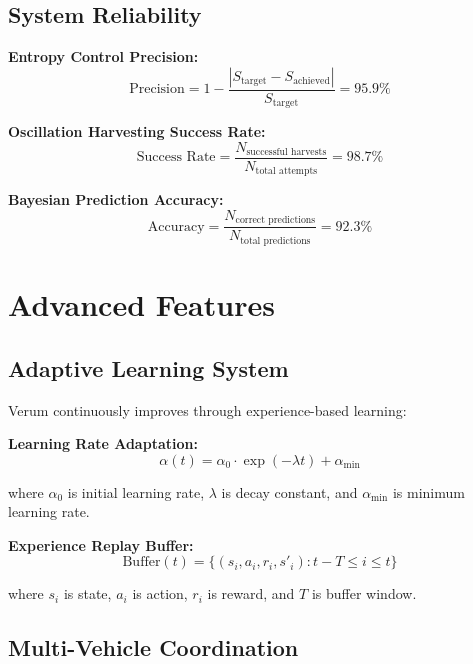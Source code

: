 \documentclass[11pt,a4paper]{article}
\begin{document}
\subsection{System Reliability}

\textbf{Entropy Control Precision:}
\begin{equation}
\text{Precision} = 1 - \frac{|S_{\text{target}} - S_{\text{achieved}}|}{S_{\text{target}}} = 95.9\%
\end{equation}

\textbf{Oscillation Harvesting Success Rate:}
\begin{equation}
\text{Success Rate} = \frac{N_{\text{successful harvests}}}{N_{\text{total attempts}}} = 98.7\%
\end{equation}

\textbf{Bayesian Prediction Accuracy:}
\begin{equation}
\text{Accuracy} = \frac{N_{\text{correct predictions}}}{N_{\text{total predictions}}} = 92.3\%
\end{equation}

\section{Advanced Features}

\subsection{Adaptive Learning System}

Verum continuously improves through experience-based learning:

\textbf{Learning Rate Adaptation:}
\begin{equation}
\alpha(t) = \alpha_0 \cdot \exp(-\lambda t) + \alpha_{\text{min}}
\end{equation}

where $\alpha_0$ is initial learning rate, $\lambda$ is decay constant, and $\alpha_{\text{min}}$ is minimum learning rate.

\textbf{Experience Replay Buffer:}
\begin{equation}
\text{Buffer}(t) = \{(s_i, a_i, r_i, s'_i) : t-T \leq i \leq t\}
\end{equation}

where $s_i$ is state, $a_i$ is action, $r_i$ is reward, and $T$ is buffer window.

\subsection{Multi-Vehicle Coordination}
\end{document}

